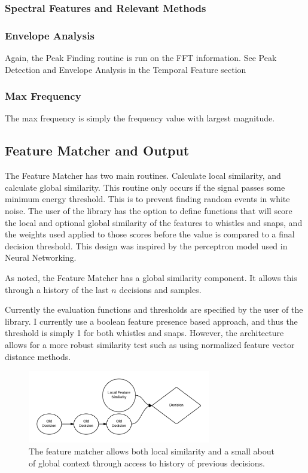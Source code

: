 \documentclass[DIV=calc, paper=a4, fontsize=11pt, twocolumn]{scrartcl}   %
\begin{document}
\subsubsection{Spectral Features and Relevant Methods}
   \subsubsection{Envelope Analysis}
   Again, the Peak Finding routine is run on the FFT information. See Peak Detection and Envelope Analysis in the Temporal Feature section
   \subsubsection{Max Frequency}
   The max frequency is simply the frequency value with largest magnitude.



\subsection{Feature Matcher and Output}
The Feature Matcher has two main routines. Calculate local similarity, and calculate global similarity. This routine only occurs if the signal passes some minimum energy threshold. This is to prevent finding random events in white noise. The user of the library has the option to define functions that will score the local and optional global similarity of the features to whistles and snaps, and the weights used applied to those scores before the value is compared to a final decision threshold. This design was inspired by the perceptron model used in Neural Networking.
\par As noted, the Feature Matcher has a global similarity component. It allows this through a history of the last $n$ decisions and samples.
\par Currently the evaluation functions and thresholds are specified by the user of the library. I currently use a boolean feature presence based approach, and thus the threshold is simply 1 for both whistles and snaps. However, the architecture allows for a more robust similarity test such as using normalized feature vector distance methods.

\begin{figure}[h]
   \centering
   \includegraphics[width=80mm]{figures/FeatureMatcherFuture.png}
   \caption{The feature matcher allows both local similarity and a small about of global context through access to history of previous decisions.}
   \label{overflow}
\end{figure}
\end{document}
